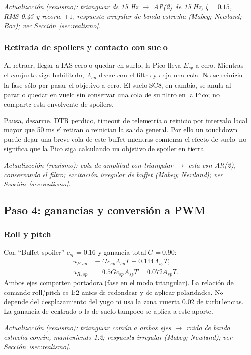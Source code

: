 \documentclass[11pt,a4paper]{article}
\begin{document}
\textit{Actualización (realismo): triangular de 15 Hz $\rightarrow$ AR(2) de 15 Hz, $\zeta=0.15$, RMS 0.45 y recorte $\pm1$; respuesta irregular de banda estrecha (Mabey; Newland; Box); ver Sección~\ref{sec:realismo}.}

\subsubsection{Retirada de spoilers y contacto con suelo}
Al retraer, llegar a IAS cero o quedar en suelo, la Pico lleva $E_{sp}$ a cero. Mientras el conjunto siga habilitado, $A_{sp}$ decae con el filtro y deja una cola. No se reinicia la fase sólo por pasar el objetivo a cero. El suelo SC8, en cambio, se anula al parar o quedar en vuelo sin conservar una cola de su filtro en la Pico; no comparte esta envolvente de spoilers.

Pausa, desarme, DTR perdido, timeout de telemetría o reinicio por intervalo local mayor que 50 ms sí retiran o reinician la salida general. Por ello un touchdown puede dejar una breve cola de este buffet mientras comienza el efecto de suelo; no significa que la Pico siga calculando un objetivo de spoiler en tierra.

\textit{Actualización (realismo): cola de amplitud con triangular $\rightarrow$ cola con AR(2), conservando el filtro; excitación irregular de buffet (Mabey; Newland); ver Sección~\ref{sec:realismo}.}

\subsection{Paso 4: ganancias y conversión a PWM}
\subsubsection{Roll y pitch}
Con ``Buffet spoiler'' $c_{sp}=0.16$ y ganancia total $G=0.90$:
\begin{align}
u_{P,sp}&=Gc_{sp}A_{sp}T=0.144A_{sp}T,\\
u_{R,sp}&=0.5Gc_{sp}A_{sp}T=0.072A_{sp}T.
\end{align}
Ambos ejes comparten portadora (fase en el modo triangular). La relación de comando roll/pitch es 1:2 antes de redondear y de aplicar polaridades. No depende del desplazamiento del yugo ni usa la zona muerta 0.02 de turbulencias. La ganancia de centrado o la de suelo tampoco se aplica a este aporte.

\textit{Actualización (realismo): triangular común a ambos ejes $\rightarrow$ ruido de banda estrecha común, manteniendo 1:2; respuesta irregular (Mabey; Newland); ver Sección~\ref{sec:realismo}.}
\end{document}
